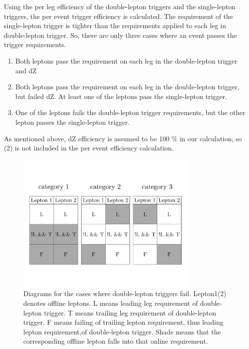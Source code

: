 Using the per leg efficiency of the double-lepton triggers and the single-lepton triggers, 
the per event trigger efficiency is calculated. The requirement of the 
single-lepton trigger is tighter than the requirements applied to each leg in 
double-lepton trigger. 
So, there are only three cases where an event passes the trigger requirements. 
\begin{enumerate}
\item Both leptons pass the requirement on each leg in the double-lepton trigger and dZ 
\item Both leptons pass the requirement on each leg in the double-lepton trigger, 
      but failed dZ. 
      At least one of the leptons pass the single-lepton trigger.
\item One of the leptons fails the double-lepton trigger requirements, 
      but the other lepton passes the single-lepton trigger.
\end{enumerate}
As mentioned above, dZ efficiency is assumed to be 100 \% in our calculation, 
so (2) is not included in the per event efficiency calculation.  
\begin{figure}[t]
\centering
\includegraphics[width=0.8\textwidth]{figures/TriggerEfficiencyDiagram.pdf}
\caption{ Diagrams for the cases where double-lepton triggers fail. Lepton1(2) 
denotes offline leptons. L means leading leg requirement of double-lepton trigger. 
T means trailing leg requirement of double-lepton trigger. F means failing of 
trailing lepton requirement, thus leading lepton requirement,of double-lepton trigger.
Shade means that the corresponding offline lepton falls into that online requirement.}
\label{fig:trg_eff_diagram}
\end{figure}
